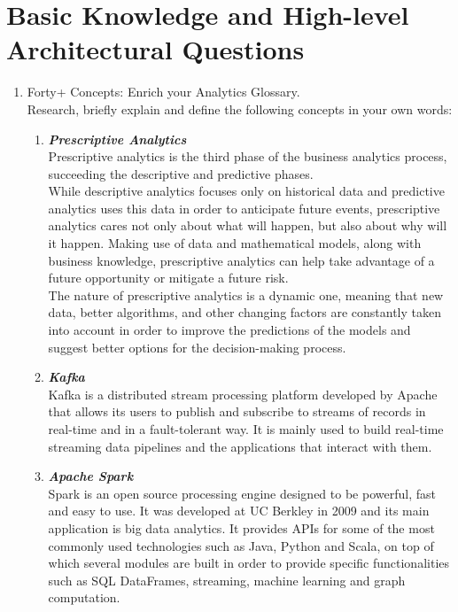 \documentclass{article}
\begin{document}
\section{Basic Knowledge and High-level Architectural Questions}
    \begin{enumerate}[label=(\alph*)]
        \item Forty+ Concepts: Enrich your Analytics Glossary.\\
        Research, briefly explain and define the following concepts in your own words:
        \begin{enumerate}[label=\textbf{\arabic*.}]
        
            \item \textbf{\textit{Prescriptive Analytics}}\\
Prescriptive analytics is the third phase of the business analytics process, succeeding the descriptive and predictive phases.\\
While descriptive analytics focuses only on historical data and predictive analytics uses this data in order to anticipate future events, prescriptive analytics cares not only about what will happen, but also about why will it happen. Making use of data and mathematical models, along with business knowledge, prescriptive analytics can help take advantage of a future opportunity or mitigate a future risk.\\
The nature of prescriptive analytics is a dynamic one, meaning that new data, better algorithms, and other changing factors are constantly taken into account in order to improve the predictions of the models and suggest better options for the decision-making process. 

            \item \textbf{\textit{Kafka}}\\
Kafka is a distributed stream processing platform developed by Apache that allows its users to publish and subscribe to streams of records in real-time and in a fault-tolerant way. It is mainly used to build real-time streaming data pipelines and the applications that interact with them.

            \item \textbf{\textit{Apache Spark}}\\
Spark is an open source processing engine designed to be powerful, fast and easy to use. It was developed at UC Berkley in 2009 and its main application is big data analytics. It provides APIs for some of the most commonly used technologies such as Java, Python and Scala, on top of which several modules are built in order to provide specific functionalities such as SQL DataFrames, streaming, machine learning and graph computation.


\end{enumerate}
\end{enumerate}
\end{document}
